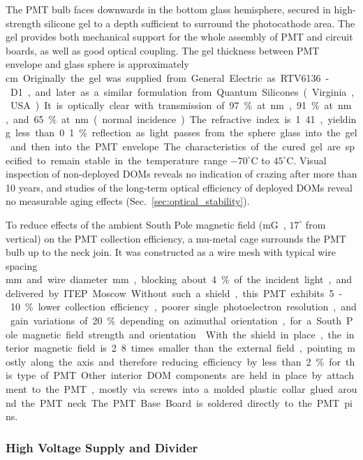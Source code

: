 The PMT bulb faces downwards in the bottom glass hemisphere, secured in high-strength 
silicone gel to a depth sufficient to surround the photocathode area.  
The gel provides both mechanical support for the whole assembly of PMT and circuit boards,
as well as good optical coupling.  
The gel thickness between PMT envelope and glass sphere is approximately \unit[1]cm.  
Originally the gel was supplied from General Electric as RTV6136-D1,
and later as a similar formulation from Quantum Silicones (Virginia, USA).  
It is optically clear with transmission of 97\% at \unit[400]nm, 91\% at \unit[340]nm, and 65\% at \unit[300]nm
(normal incidence).  The refractive index is 1.41, yielding less than 0.1\% reflection as light
passes from the sphere glass into the gel and then into the PMT envelope.
The characteristics of the cured gel are specified to remain stable in the
temperature range $-70^\circ$C to $45^\circ$C.  Visual inspection of
non-deployed DOMs reveals no indication of crazing after more than 10
years, and studies of the long-term optical efficiency of deployed DOMs
reveal no measurable aging effects (Sec.~\ref{sec:optical_stability}).  

To reduce effects of the ambient South Pole magnetic field (\unit[550]mG, $17^\circ$
from vertical) on the PMT collection efficiency, a mu-metal cage surrounds the PMT bulb up to
the neck join.  It was constructed as a wire mesh with typical wire spacing \unit[66]mm and
wire diameter \unit[1]mm, blocking about 4\% of the incident light,
and delivered by ITEP Moscow.
Without such a shield, this PMT exhibits 5-10\% lower
collection efficiency, poorer single photoelectron resolution, and gain variations of 20\% depending on 
azimuthal orientation, for a South Pole magnetic field strength and orientation~\cite{calvo}.
With the shield in place, the interior magnetic field is 2.8 times
smaller than the external field, pointing mostly along the axis and therefore reducing efficiency by
less than 2\% for this type of PMT.

Other interior DOM components are held in place by attachment to the PMT, mostly via screws into
a molded plastic collar glued around the PMT neck.  The PMT Base Board is
soldered directly to the PMT pins.

\subsubsection{\label{sec:hv}High Voltage Supply and Divider}

